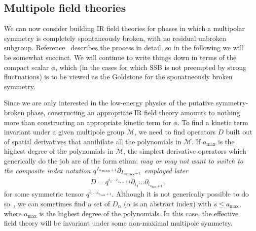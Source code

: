 \documentclass[pra,aps,twocolumn, amsfonts,amsmath,amssymb,nofootinbib,superscriptaddress]{revtex4-2}
\newcommand{\ethan}[1]{ { \color{blue} \footnotesize \textsf{ethan: \textsl{#1}} }}
\newcommand{\p}{\partial}
\providecommand{\DIFaddtex}[1]{{\protect\color{blue}\uwave{#1}}} %
\providecommand{\DIFaddbegin}{} %
\providecommand{\DIFaddend}{} %
\providecommand{\DIFadd}[1]{\texorpdfstring{\DIFaddtex{#1}}{#1}} %
\newcommand{\DIFaddincludegraphics}[2][]{{\color{blue}\fbox{\DIFOincludegraphics[#1]{#2}}}} %
\DeclareRobustCommand{\DIFaddbegin}{\DIFOaddbegin \let\includegraphics\DIFaddincludegraphics} %
\DeclareRobustCommand{\DIFaddend}{\DIFOaddend \let\includegraphics\DIFOincludegraphics} %
\begin{document}
\subsection{Multipole field theories} \label{sub:field}

We can now consider building IR field theories for phases in which a multipolar symmetry is completely spontaneously broken, with no residual unbroken subgroup. Reference~\cite{Gromov2019} describes the process in detail, so in the following we will be somewhat succinct. 
We will continue to write things down in terms of the compact scalar $\phi$, which (\DIFaddbegin \DIFadd{at }\DIFaddend in the cases for which SSB is not preempted by strong fluctuations) is to be viewed as the Goldstone for the sponatneously broken symmetry. 

Since we are only interested in the low-energy physics of the putative symmetry-broken phase, constructing an appropriate IR field theory amounts to nothing more than constructing an appropriate kinetic term for $\phi$. 
To find a kinetic term invariant under a given multipole group $\mathcal{M}$, we need to find operators $D$ built out of spatial derivatives that annihilate all the polynomials in $\mathcal{M}$. If $a_\text{max}$ is the highest degree of the polynomials in $\mathcal{M}$, the simplest derivative operators which generically do the job are of the form \DIFaddbegin \ethan{may or may not want to switch to the composite index notation $q^{I_{a_{\rm max}+1}} \p_{I_{a_{\rm max}+1}}$ employed later}
\DIFaddend \begin{align}
D = q^{i_1\dots i_{a_\text{max}+1}}\partial_{i_1}\dots \partial_{i_{a_\text{max}+1}},
\end{align}
for some symmetric tensor $q^{i_1\dots i_{a_\text{max}+1}}$. Although it is not generically possible to do so~\cite{Gromov2019}, we can sometimes find a set of $D_\alpha$ ($\alpha$ is an abstract index) with $s\le a_{\text{max}}$, where $a_\text{max}$ is the highest degree of the polynomials. In this case, the effective field theory will be invariant under some non-maximal multipole symmetry.
\end{document}
